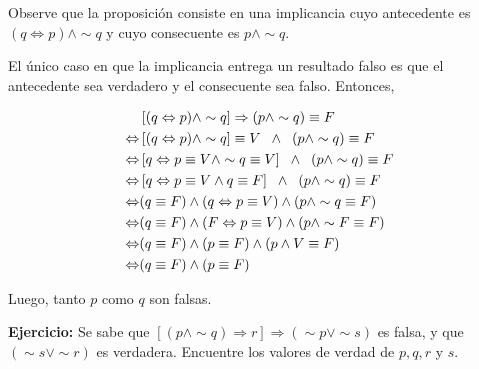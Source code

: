 \documentclass[a4paper,10pt]{article}
\begin{document}
    Observe que la proposición consiste en una implicancia cuyo antecedente es $(q \Leftrightarrow p) \wedge \sim q$ y cuyo consecuente es $p \wedge \sim q$.

    El único caso en que la implicancia entrega un resultado falso es que el antecedente sea verdadero y el consecuente sea falso. Entonces,

    \begin{align*}
                        &  \left[ (q \Leftrightarrow p) \wedge \sim q \right] \Rightarrow (p\wedge \sim q) \equiv F \\
        \Leftrightarrow &  \left[ (q \Leftrightarrow p) \wedge \sim q \right] \equiv V  \hspace{2mm}  \wedge  \hspace{2mm}  (p \wedge \sim q) \equiv F \\
        \Leftrightarrow &  \left[ q \Leftrightarrow p \equiv V  \wedge \sim q \equiv V \right] \hspace{2mm}  \wedge  \hspace{2mm}  (p \wedge \sim q) \equiv F \\
        \Leftrightarrow &  \left[ q \Leftrightarrow p \equiv V  \wedge  q \equiv F \right] \hspace{2mm}  \wedge  \hspace{2mm}  (p \wedge \sim q) \equiv F \\
        \Leftrightarrow &  (q \equiv F) \wedge ( q \Leftrightarrow p \equiv V ) \wedge   (p \wedge \sim q \equiv F) \\
        \Leftrightarrow &  (q \equiv F) \wedge ( F \Leftrightarrow p \equiv V ) \wedge   (p \wedge \sim F \equiv F) \\
        \Leftrightarrow &  (q \equiv F) \wedge ( p \equiv F ) \wedge   (p \wedge V \equiv F) \\
        \Leftrightarrow &  (q \equiv F) \wedge ( p \equiv F )
    \end{align*}

    Luego, tanto $p$ como $q$ son falsas.
    \vspace{5mm}








\textbf{Ejercicio:} Se sabe que $\left[(p \wedge \sim q) \Rightarrow r \right] \Rightarrow (\sim p \vee \sim s)$ es falsa, y que $(\sim s \vee \sim r)$ es verdadera. Encuentre los valores de verdad de $p,q,r$ y $s$. \vspace{3mm}
\end{document}
